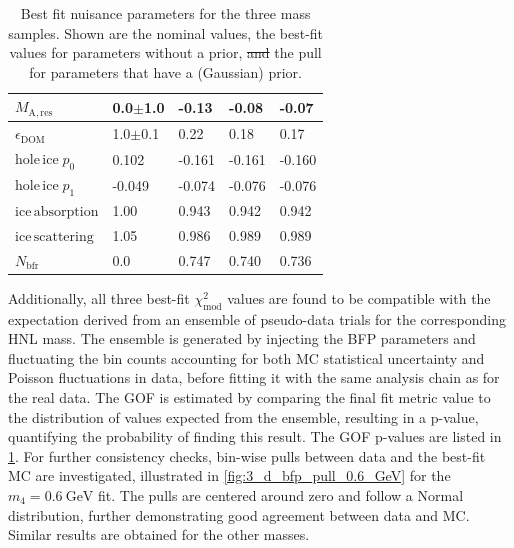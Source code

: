 \documentclass[
    aps,
    prd,
    reprint,
    amsmath,
    amssymb,
    nofootinbib,
    linenumbers,
    superscriptaddress,
    floatfix
]{revtex4-2}
\newcommand{\gev}{\giga\electronvolt}
\renewcommand{\rm}{\mathrm}
\newcommand{\rm}{\mathrm}
\providecommand{\DIFaddtex}[1]{{\protect\color{blue}\uwave{#1}}} %
\providecommand{\DIFdeltex}[1]{{\protect\color{red}\sout{#1}}}                      %
\providecommand{\DIFaddFL}[1]{\DIFadd{#1}} %
\providecommand{\DIFdelFL}[1]{\DIFdel{#1}} %
\providecommand{\DIFaddbeginFL}{} %
\providecommand{\DIFaddendFL}{} %
\providecommand{\DIFdelbeginFL}{} %
\providecommand{\DIFdelendFL}{} %
\providecommand{\DIFadd}[1]{\texorpdfstring{\DIFaddtex{#1}}{#1}} %
\providecommand{\DIFdel}[1]{\texorpdfstring{\DIFdeltex{#1}}{}} %
\newcommand{\DIFscaledelfig}{0.5}
\newlength{\DIFdelgraphicswidth} %
\newlength{\DIFdelgraphicsheight} %
\newcommand{\DIFaddincludegraphics}[2][]{{\color{blue}\fbox{\DIFOincludegraphics[#1]{#2}}}} %
\newcommand{\DIFdelincludegraphics}[2][]{%
\sbox{\DIFdelgraphicsbox}{\DIFOincludegraphics[#1]{#2}}%
\settoboxwidth{\DIFdelgraphicswidth}{\DIFdelgraphicsbox} %
\settoboxtotalheight{\DIFdelgraphicsheight}{\DIFdelgraphicsbox} %
\scalebox{\DIFscaledelfig}{%
\parbox[b]{\DIFdelgraphicswidth}{\usebox{\DIFdelgraphicsbox}\\[-\baselineskip] \rule{\DIFdelgraphicswidth}{0em}}\llap{\resizebox{\DIFdelgraphicswidth}{\DIFdelgraphicsheight}{%
\setlength{\unitlength}{\DIFdelgraphicswidth}%
\begin{picture}(1,1)%
\thicklines\linethickness{2pt} %
{\color[rgb]{1,0,0}\put(0,0){\framebox(1,1){}}}%
{\color[rgb]{1,0,0}\put(0,0){\line( 1,1){1}}}%
{\color[rgb]{1,0,0}\put(0,1){\line(1,-1){1}}}%
\end{picture}%
}\hspace*{3pt}}} %
} %
\DeclareRobustCommand{\DIFaddbeginFL}{\DIFOaddbeginFL \let\includegraphics\DIFaddincludegraphics} %
\DeclareRobustCommand{\DIFaddendFL}{\DIFOaddendFL \let\includegraphics\DIFOincludegraphics} %
\DeclareRobustCommand{\DIFdelbeginFL}{\DIFOdelbeginFL \let\includegraphics\DIFdelincludegraphics} %
\DeclareRobustCommand{\DIFdelendFL}{\DIFOaddendFL \let\includegraphics\DIFOincludegraphics} %
\begin{document}
\begin{table}[h]
\begin{tabular}{ ll lll }
    $M_\rm{A,res}$                                   &    0.0$\pm$1.0       &          -0.13      &          -0.08      &          -0.07      \\ 
    \hline
    $\epsilon_{\rm{DOM}}$                            &    1.0$\pm$0.1       &           0.22      &           0.18      &           0.17      \\ 
    $\rm{hole \, ice} \; p_0$                        &    0.102             &          -0.161     &          -0.161     &          -0.160     \\ 
    $\rm{hole \, ice} \; p_1$                        &   -0.049             &          -0.074     &          -0.076     &          -0.076     \\ 
    $\rm{ice \, absorption}$                         &    1.00              &           0.943     &           0.942     &           0.942     \\ 
    $\rm{ice \, scattering}$                         &    1.05              &           0.986     &           0.989     &           0.989     \\ 
    $N_\rm{bfr}$                                     &    0.0               &           0.747     &           0.740     &           0.736     \\
    \hline
    \end{tabular}
\caption{Best fit nuisance parameters for the three mass samples. Shown are the nominal values, the best-fit values for parameters without a prior, \DIFdelbeginFL \DIFdelFL{and }\DIFdelendFL \DIFaddbeginFL \DIFaddFL{or }\DIFaddendFL the pull \DIFaddbeginFL \DIFaddFL{in units of $\sigma$ }\DIFaddendFL for parameters that have a (Gaussian) prior.}
\label{tab:best_fit_parameters}
\end{table}

Additionally, all three best-fit $\chi^2_{\mathrm{mod}}$ values are found to be compatible with the expectation derived from an ensemble of pseudo-data trials for the corresponding HNL mass.
The ensemble is generated by injecting the BFP parameters and fluctuating the bin counts accounting for both MC statistical uncertainty and Poisson fluctuations in data, before fitting it with the same analysis chain as for the real data.
The GOF is estimated by comparing the final fit metric value to the distribution of values expected from the ensemble, resulting in a p-value, quantifying the probability of finding this result. 
The GOF p-values are listed in \cref{tab:best_fit_parameters}. For further consistency checks, bin-wise pulls between data and the best-fit MC are investigated, illustrated in \cref{fig:3_d_bfp_pull_0.6_GeV} for the $m_{4}=\SI{0.6}{\gev}$ fit.
The pulls are centered around zero and follow a Normal distribution, further demonstrating good agreement between data and MC.
Similar results are obtained for the other masses.
\end{document}
